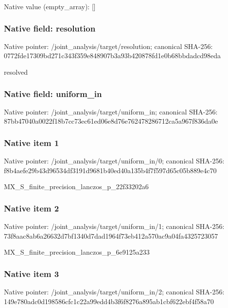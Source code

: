 \documentclass[10pt,a4paper]{article}
\begin{document}
Native value (empty\_\allowbreak{}array): []

\subsubsection{Native field: resolution}
Native pointer: /joint\_\allowbreak{}analysis/target/resolution; canonical SHA-256: 0772fde17309bd271c343f359e848907b3a93b420878fd1e0b68bbdadcd98eda

\begingroup\raggedright\sloppy resolved\par\endgroup

\subsubsection{Native field: uniform\_\allowbreak{}in}
Native pointer: /joint\_\allowbreak{}analysis/target/uniform\_\allowbreak{}in; canonical SHA-256: 87bb47040a0022f18b7cc73ec61ed06e8d76e762478286712ca5a967f836da0e

\subsubsection{Native item 1}
Native pointer: /joint\_\allowbreak{}analysis/target/uniform\_\allowbreak{}in/0; canonical SHA-256: f8b4aefe29b43d96534df3191d9681b40ed40a135b4f7f597d65c05b889e4c70

\begingroup\raggedright\sloppy MX\_\allowbreak{}S\_\allowbreak{}finite\_\allowbreak{}precision\_\allowbreak{}lanczos\_\allowbreak{}p\_\allowbreak{}22f33202a6\par\endgroup

\subsubsection{Native item 2}
Native pointer: /joint\_\allowbreak{}analysis/target/uniform\_\allowbreak{}in/1; canonical SHA-256: 73f8aac8ab6a26632d7bf1340d7dad1964f73eb412a570ac9a04fa4325723057

\begingroup\raggedright\sloppy MX\_\allowbreak{}S\_\allowbreak{}finite\_\allowbreak{}precision\_\allowbreak{}lanczos\_\allowbreak{}p\_\allowbreak{}6e9125a233\par\endgroup

\subsubsection{Native item 3}
Native pointer: /joint\_\allowbreak{}analysis/target/uniform\_\allowbreak{}in/2; canonical SHA-256: 149e780adc0d198586cfc1c22a99edd4b3f6f8276a895ab1cbf622ebf4f58a70
\end{document}
